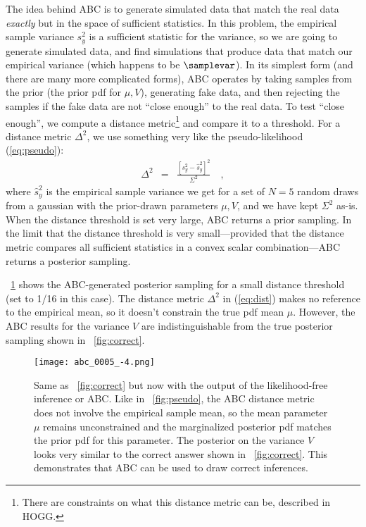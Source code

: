 \documentclass[12pt, letterpaper, preprint]{aastex}
\begin{document}
The idea behind ABC is to generate simulated data that match the
real data \emph{exactly} but in the space of sufficient statistics.
In this problem, the empirical sample variance $s^2_y$ is a sufficient
statistic for the variance, so we are going to generate simulated
data, and find simulations that produce data that match our empirical
variance (which happens to be $\samplevar$).
In its simplest form (and there are many more complicated forms), ABC
operates by taking samples from the prior (the prior pdf for $\mu,
V$), generating fake data, and then rejecting the samples if the fake
data are not ``close enough'' to the real data.
To test ``close enough'', we compute a distance metric\footnote{There
  are constraints on what this distance metric can be, described in
  HOGG.} and compare it to a threshold.
For a distance metric $\Delta^2$, we use something very like the
pseudo-likelihood (\ref{eq:pseudo}):
\begin{eqnarray}
\Delta^2 &=& \frac{[s^2_y - \hat{s}^2_y]^2}{\Sigma^2}
\label{eq:dist}\quad ,
\end{eqnarray}
where $\hat{s}^2_y$ is the empirical sample variance we get for a set
of $N=5$ random draws from a gaussian with the prior-drawn parameters
$\mu, V$, and we have kept $\Sigma^2$ as-is.
When the distance threshold is set very large, ABC returns a prior
sampling.
In the limit that the distance threshold is very small---provided that
the distance metric compares all sufficient statistics in a convex
scalar combination---ABC returns a posterior sampling.

\figurename~\ref{fig:abc} shows the ABC-generated posterior sampling
for a small distance threshold (set to 1/16 in this case).
The distance metric $\Delta^2$ in (\ref{eq:dist}) makes no reference
to the empirical mean, so it doesn't constrain the true pdf mean
$\mu$.
However, the ABC results for the variance $V$ are indistinguishable
from the true posterior sampling shown in \figurename~\ref{fig:correct}.%
\begin{figure}
\texttt{[image: abc\_0005\_-4.png]}
\caption{Same as \figurename~\ref{fig:correct} but now with the output
  of the likelihood-free inference or ABC. Like in
  \figurename~\ref{fig:pseudo}, the ABC distance metric does not
  involve the empirical sample mean, so the mean parameter $\mu$
  remains unconstrained and the marginalized posterior pdf matches the
  prior pdf for this parameter. The posterior on the variance $V$
  looks very similar to the correct answer shown in
  \figurename~\ref{fig:correct}. This demonstrates that ABC can be
  used to draw correct inferences.\label{fig:abc}}
\end{figure}
\end{document}
